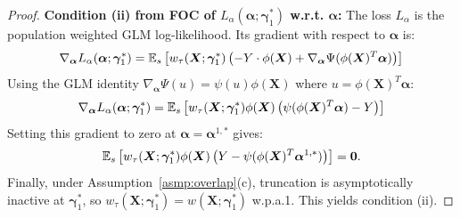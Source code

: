 \documentclass{article}
\begin{document}
\begin{proof}
\textbf{Condition (ii) from FOC of $L_{\alpha}(\boldsymbol{\alpha}; \boldsymbol{\gamma}_1^*)$ w.r.t. $\boldsymbol{\alpha}$:}
The loss $L_{\alpha}$ is the population weighted GLM log-likelihood. Its gradient with respect to $\boldsymbol{\alpha}$ is:
\[
\nabla_{\boldsymbol{\alpha}} L_{\alpha}(\boldsymbol{\alpha}; \boldsymbol{\gamma}_1^*) = \operatorname{\mathbb{E}}_{s} \left[ w_\tau(\boldsymbol{X}; \boldsymbol{\gamma}_1^*) \left( -Y \cdot \phi(\boldsymbol{X}) + \nabla_{\boldsymbol{\alpha}}\Psi(\phi(\boldsymbol{X})^T \boldsymbol{\alpha}) \right) \right]
\]
Using the GLM identity $\nabla_{\boldsymbol{\alpha}}\Psi(u) = \psi(u) \phi(\boldsymbol{X})$ where $u = \phi(\boldsymbol{X})^T \boldsymbol{\alpha}$:
\[
\nabla_{\boldsymbol{\alpha}} L_{\alpha}(\boldsymbol{\alpha}; \boldsymbol{\gamma}_1^*) = \operatorname{\mathbb{E}}_{s} \left[ w_\tau(\boldsymbol{X}; \boldsymbol{\gamma}_1^*) \phi(\boldsymbol{X}) \left( \psi(\phi(\boldsymbol{X})^T \boldsymbol{\alpha}) - Y \right) \right]
\]
Setting this gradient to zero at $\boldsymbol{\alpha} = \boldsymbol{\alpha}^{1,*}$ gives:
\[
\operatorname{\mathbb{E}}_{s} \left[ w_\tau(\boldsymbol{X}; \boldsymbol{\gamma}_1^*) \phi(\boldsymbol{X}) \left( Y - \psi(\phi(\boldsymbol{X})^T \boldsymbol{\alpha}^{1,*}) \right) \right] = \mathbf{0}.
\]
Finally, under Assumption~\ref{asmp:overlap}(c), truncation is asymptotically inactive at $\boldsymbol{\gamma}_1^*$, so $w_\tau(\boldsymbol{X};\boldsymbol{\gamma}_1^*) = w(\boldsymbol{X};\boldsymbol{\gamma}_1^*)$ w.p.a.1. This yields condition (ii).
\end{proof}
\end{document}
